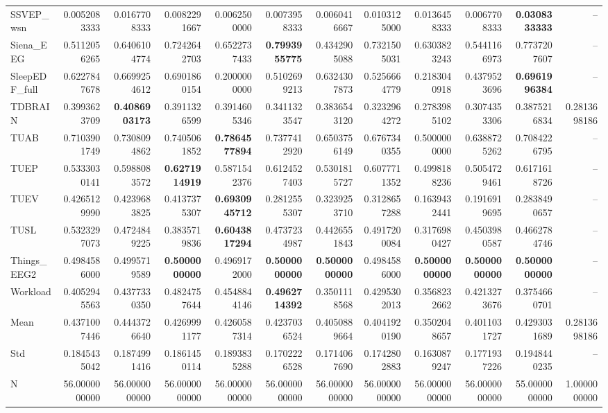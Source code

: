 \begin{table}[htbp]
\begin{tabular}{lrrrrrrrrrrr}
SSVEP_wsn & 0.0052083333 & 0.0167708333 & 0.0082291667 & 0.0062500000 & 0.0073958333 & 0.0060416667 & 0.0103125000 & 0.0136458333 & 0.0067708333 & \bfseries 0.0308333333 & -- \\
Siena_EEG & 0.5112056265 & 0.6406104774 & 0.7242642703 & 0.6522737433 & \bfseries 0.7993955775 & 0.4342905088 & 0.7321505031 & 0.6303823243 & 0.5441166973 & 0.7737207607 & -- \\
SleepEDF_full & 0.6227847678 & 0.6699254612 & 0.6901860154 & 0.2000000000 & 0.5102699213 & 0.6324307873 & 0.5256664779 & 0.2183040918 & 0.4379523696 & \bfseries 0.6961996384 & -- \\
TDBRAIN & 0.3993623709 & \bfseries 0.4086903173 & 0.3911326599 & 0.3914605346 & 0.3411323547 & 0.3836543120 & 0.3232964272 & 0.2783985102 & 0.3074353306 & 0.3875216834 & 0.2813698186 \\
TUAB & 0.7103901749 & 0.7308094862 & 0.7405061852 & \bfseries 0.7864577894 & 0.7377412920 & 0.6503756149 & 0.6767340355 & 0.5000000000 & 0.6388725262 & 0.7084226795 & -- \\
TUEP & 0.5333030141 & 0.5988083572 & \bfseries 0.6271914919 & 0.5871542376 & 0.6124527403 & 0.5301815727 & 0.6077711352 & 0.4998188236 & 0.5054729461 & 0.6171618726 & -- \\
TUEV & 0.4265129990 & 0.4239683825 & 0.4137375307 & \bfseries 0.6930945712 & 0.2812555307 & 0.3239253710 & 0.3128657288 & 0.1639432441 & 0.1916919695 & 0.2838490657 & -- \\
TUSL & 0.5323297073 & 0.4724849225 & 0.3835719836 & \bfseries 0.6043817294 & 0.4737234987 & 0.4426551843 & 0.4917200084 & 0.3176980427 & 0.4503980587 & 0.4662784746 & -- \\
Things_EEG2 & 0.4984586000 & 0.4995719589 & \bfseries 0.5000000000 & 0.4969172000 & \bfseries 0.5000000000 & \bfseries 0.5000000000 & 0.4984586000 & \bfseries 0.5000000000 & \bfseries 0.5000000000 & \bfseries 0.5000000000 & -- \\
Workload & 0.4052945563 & 0.4377330350 & 0.4824757644 & 0.4548844146 & \bfseries 0.4962714392 & 0.3501118568 & 0.4295302013 & 0.3568232662 & 0.4213273676 & 0.3754660701 & -- \\
Mean & 0.4371007446 & 0.4443726640 & 0.4269991177 & 0.4260587314 & 0.4237036524 & 0.4050889664 & 0.4041920190 & 0.3502048657 & 0.4011031727 & 0.4293031689 & 0.2813698186 \\
Std & 0.1845435042 & 0.1874991416 & 0.1861450114 & 0.1893835288 & 0.1702226528 & 0.1714067690 & 0.1742802883 & 0.1630879247 & 0.1771937226 & 0.1948440235 & -- \\
N & 56.0000000000 & 56.0000000000 & 56.0000000000 & 56.0000000000 & 56.0000000000 & 56.0000000000 & 56.0000000000 & 56.0000000000 & 56.0000000000 & 55.0000000000 & 1.0000000000 \\
\bottomrule
\end{tabular}
\end{table}
